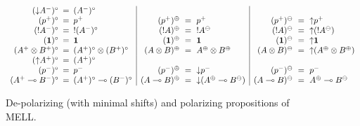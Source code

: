 \begin{figure}
{\small \[
\begin{array}{rcl|rcl|rcl}
({\downarrow}A^-)^\circ & \!\!\!=\!\!\! & (A^-)^\circ & & & & & & 
\\
(p^+)^\circ & \!\!\!=\!\!\! & p^+ &
(p^+)^\oplus & \!\!\!=\!\!\! & p^+ &
(p^+)^\ominus & \!\!\!=\!\!\! & {\uparrow}p^+
\\
({!}A^-)^\circ & \!\!\!=\!\!\! & {!}(A^-)^\circ &
({!}A)^\oplus & \!\!\!=\!\!\! & {!}A^\ominus &
({!}A)^\ominus & \!\!\!=\!\!\! & {\uparrow}({!}A^\ominus)
\\
(\one)^\circ & \!\!\!=\!\!\! & \one &
(\one)^\oplus & \!\!\!=\!\!\! & \one &
(\one)^\ominus & \!\!\!=\!\!\! & {\uparrow}\one 
\\
(A^+ \otimes B^+)^\circ & \!\!\!=\!\!\! & (A^+)^\circ \otimes (B^+)^\circ &
(A \otimes B)^\oplus & \!\!\!=\!\!\! & A^\oplus \otimes B^\oplus &
(A \otimes B)^\ominus & \!\!\!=\!\!\! & {\uparrow}(A^\oplus \otimes B^\oplus)
\\
({\uparrow}A^+)^\circ & \!\!\!=\!\!\! & (A^+)^\circ & & & & & & 
\\
(p^-)^\circ & \!\!\!=\!\!\! & p^- &
(p^-)^\oplus & \!\!\!=\!\!\! & {\downarrow}p^- &
(p^-)^\ominus & \!\!\!=\!\!\! & p^- 
\\
(A^+ \lolli B^-)^\circ & \!\!\!=\!\!\! & (A^+)^\circ \lolli (B^-)^\circ &
(A \lolli B)^\oplus & \!\!\!=\!\!\! & {\downarrow}(A^\oplus \lolli B^\ominus) &
(A \lolli B)^\ominus & \!\!\!=\!\!\! & A^\oplus \lolli B^\ominus
\end{array}
\]}

\caption{De-polarizing (with minimal shifts) and polarizing propositions of MELL.}
\label{fig:lin-shift}
\end{figure}
